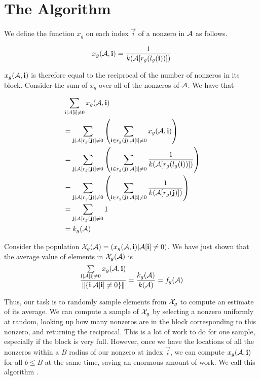 
  \section{The Algorithm}

    We define the function $x_g$ on each index $\vec{i}$ of a nonzero in $\mathbf{\mathcal{A}}$ as follows.

    \[
      x_g(\mathbf{\mathcal{A}}, \mathbf{i}) = \frac{1}{k(\mathbf{\mathcal{A}}[r_g(l_g(\mathbf{i}))])}
    \]

    $x_g(\mathbf{\mathcal{A}}, \mathbf{i})$ is therefore equal to the reciprocal of the number of nonzeros in its block. Consider the sum of $x_g$ over all of the nonzeros of $\mathbf{\mathcal{A}}$. We have that

    \begin{align*}
      &\sum\limits_{\mathbf{i} | \mathbf{\mathcal{A}}[\mathbf{i}] \neq 0} x_g(\mathbf{\mathcal{A}}, \mathbf{i})\\ &= \sum\limits_{\mathbf{j} | \mathbf{\mathcal{A}}[r_g(\mathbf{j})] \neq 0} \left(\sum\limits_{\mathbf{i} \in r_g(\mathbf{j}) | \mathbf{\mathcal{A}}[\mathbf{i}] \neq 0} x_g(\mathbf{\mathcal{A}}, \mathbf{i})\right)\\
      &= \sum\limits_{\mathbf{j} | \mathbf{\mathcal{A}}[r_g(\mathbf{j})] \neq 0} \left(\sum\limits_{\mathbf{i} \in r_g(\mathbf{j}) | \mathbf{\mathcal{A}}[\mathbf{i}] \neq 0} \frac{1}{k(\mathbf{\mathcal{A}}[r_g(l_g(\mathbf{i}))])}\right)\\
      &= \sum\limits_{\mathbf{j} | \mathbf{\mathcal{A}}[r_g(\mathbf{j})] \neq 0} \left(\sum\limits_{\mathbf{i} \in r_g(\mathbf{j}) | \mathbf{\mathcal{A}}[\mathbf{i}] \neq 0} \frac{1}{k(\mathbf{\mathcal{A}}[r_g(\mathbf{j})])}\right)\\
      &= \sum\limits_{\mathbf{j} | \mathbf{\mathcal{A}}[r_g(\mathbf{j})] \neq 0} 1\\
      &= k_g(\mathbf{\mathcal{A}})\\
    \end{align*}

    Consider the population $\mathcal{X}_g(\mathbf{\mathcal{A}}) = \left(x_g(\mathbf{\mathcal{A}}, \mathbf{i}) | \mathbf{\mathcal{A}}[\mathbf{i}] \neq 0\right)$. We have just shown that the average value of elements in $\mathcal{X}_g(\mathbf{\mathcal{A}})$ is
    \[
      \frac{\sum\limits_{\mathbf{i} | \mathbf{\mathcal{A}}[\mathbf{i}] \neq 0} x_g(\mathbf{\mathcal{A}}, \mathbf{i})}{\|\{\mathbf{i} | \mathbf{\mathcal{A}}[\mathbf{i}] \neq 0\}\|} = \frac{k_g(\mathbf{\mathcal{A}})}{k(\mathbf{\mathcal{A}})} = f_g(\mathbf{\mathcal{A}})
    \]

    Thus, our task is to randomly sample elements from $\mathcal{X}_g$ to compute an estimate of its average. We can compute a sample of $\mathcal{X}_g$ by selecting a nonzero uniformly at random, looking up how many nonzeros are in the block corresponding to this nonzero, and returning the reciprocal. This is a lot of work to do for one sample, especially if the block is very full. However, once we have the locations of all the nonzeros within a $B$ radius of our nonzero at index $\vec{i}$, we can compute $x_g(\mathbf{\mathcal{A}}, \mathbf{i})$ for all $b \leq B$ at the same time, saving an enormous amount of work. We call this algorithm .

